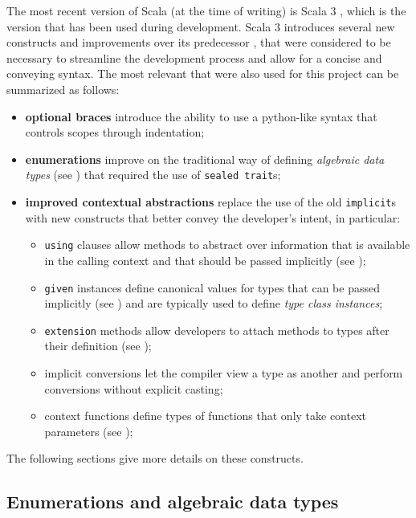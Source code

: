 The most recent version of Scala (at the time of writing) is Scala 3 \cite{scala3-reference}, which is the version that has been used during development.
%
Scala 3 introduces several new constructs and improvements over its predecessor \cite{new-in-scala-3}, that were considered to be necessary to streamline the development process and allow for a concise and conveying syntax.
%
The most relevant that were also used for this project can be summarized as follows:
%
\begin{itemize}
    \item \textbf{optional braces} introduce the ability to use a python-like syntax that controls scopes through indentation;
    \item \textbf{enumerations} improve on the traditional way of defining \textit{algebraic data types} (see ) that required the use of \texttt{sealed trait}s;
    \item \textbf{improved contextual abstractions} replace the use of the old \texttt{implicit}s with new constructs that better convey the developer's intent, in particular:
    \begin{itemize}
        \item \texttt{using} clauses allow methods to abstract over information that is available in the calling context and that should be passed implicitly (see );
        \item \texttt{given} instances define canonical values for types that can be passed implicitly (see ) and are typically used to define \textit{type class instances};
        \item \texttt{extension} methods allow developers to attach methods to types after their definition (see );
        \item implicit conversions let the compiler view a type as another and perform conversions without explicit casting;
        \item context functions define types of functions that only take context parameters (see );
    \end{itemize}
\end{itemize}

The following sections give more details on these constructs.

\subsection{Enumerations and algebraic data types}
\label{sec:enums}

